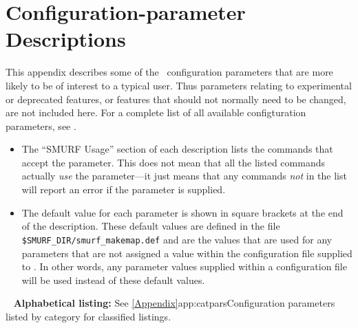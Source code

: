 \chapter{Configuration-parameter Descriptions}
\label{app:parameters}

This appendix describes some of the \makemap\ configuration parameters
that are more likely to be of interest to a typical user. Thus parameters
relating to experimental or deprecated features, or features that should
not normally need to be changed, are not included here. For a complete list
of all available configturation parameters, see
.

\begin{itemize}
\item The ``SMURF Usage'' section of each description lists the \SMURF commands
that accept the parameter. This does not mean that all the
listed commands actually \emph{use} the parameter---it just means that
any commands \emph{not} in the list will report an error if the parameter
is supplied.
\item The default value for each parameter is shown in square brackets at
the end of the description. These default values are defined in the file
\texttt{\$SMURF\_DIR/smurf\_makemap.def} and are the values that are used
for any parameters that are not assigned a value within the configuration
file supplied to \makemap. In other words, any parameter values supplied
within a configuration file will be used instead of these default values.
\end{itemize}
\ifpdf
\else
~\newline
\textbf{\large Alphabetical listing:} \newline
See \cref{Appendix}{app:catpars}{Configuration parameters listed by
category} for classified listings.
\fi

\sstminitoc{}
\sstnomaintoc

\sstmaintoc

